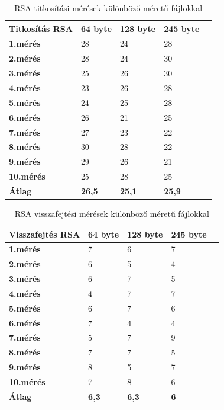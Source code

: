 \begin{table}[H]
	\centering
	\caption{RSA titkosítási mérések különböző méretű fájlokkal}
	\label{tab:enc_rsa}
	\medskip
	\begin{tabular}{|p{2.4cm}|p{2cm}|p{2cm}|p{2cm}|p{2cm}|}
		\hline
		\textbf{Titkosítás} \newline \textbf{RSA} & \textbf{64 byte} & \textbf{128 byte} & \textbf{245 byte}\\
		\hline
		\textbf{1.mérés} & 28 & 24 & 28\\
		\hline
		\textbf{2.mérés} & 28 & 24 & 30\\
		\hline
		\textbf{3.mérés} & 25 & 26 & 30\\
		\hline
		\textbf{4.mérés} & 23 & 26 & 28\\
		\hline
		\textbf{5.mérés} & 24 & 25 & 28\\
		\hline
		\textbf{6.mérés} & 26 & 21 & 25\\
		\hline
		\textbf{7.mérés} & 27 & 23 & 22\\
		\hline
		\textbf{8.mérés} & 30 & 28 & 22\\
		\hline
		\textbf{9.mérés} & 29 & 26 & 21\\
		\hline
		\textbf{10.mérés} & 25 & 28 & 25\\
		\hline
		\hline
		\textbf{Átlag} & \textbf{26,5} & \textbf{25,1} & \textbf{25,9}\\
		\hline
	\end{tabular}
\end{table}

\begin{table}[H]
	\centering
	\caption{RSA visszafejtési mérések különböző méretű fájlokkal}
	\label{tab:dec_rsa}
	\medskip
	\begin{tabular}{|p{2.4cm}|p{2cm}|p{2cm}|p{2cm}|p{2cm}|}
		\hline
		\textbf{Visszafejtés} \newline \textbf{RSA} & \textbf{64 byte} & \textbf{128 byte} & \textbf{245 byte}\\
		\hline
		\textbf{1.mérés} & 7 & 6 & 7\\
		\hline
		\textbf{2.mérés} & 6 & 5 & 4\\
		\hline
		\textbf{3.mérés} & 6 & 7 & 5\\
		\hline
		\textbf{4.mérés} & 4 & 7 & 7\\
		\hline
		\textbf{5.mérés} & 6 & 7 & 6\\
		\hline
		\textbf{6.mérés} & 7 & 4 & 4\\
		\hline
		\textbf{7.mérés} & 5 & 7 & 9\\
		\hline
		\textbf{8.mérés} & 7 & 7 & 5\\
		\hline
		\textbf{9.mérés} & 8 & 5 & 7\\
		\hline
		\textbf{10.mérés} & 7 & 8 & 6\\
		\hline
		\hline
		\textbf{Átlag} & \textbf{6,3} & \textbf{6,3} & \textbf{6}\\
		\hline
	\end{tabular}
\end{table}

